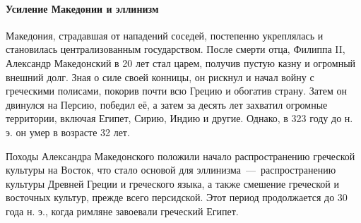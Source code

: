 \paragraph{Усиление Македонии и эллинизм}

Македония, страдавшая от нападений соседей, постепенно укреплялась и становилась централизованным государством. После смерти отца, Филиппа II, Александр Македонский в 20 лет стал царем, получив пустую казну и огромный внешний долг. Зная о силе своей конницы, он рискнул и начал войну с греческими полисами, покорив почти всю Грецию и обогатив страну. Затем он двинулся на Персию, победил её, а затем за десять лет захватил огромные территории, включая Египет, Сирию, Индию и другие. Однако, в 323 году до н. э. он умер в возрасте 32 лет.



Походы Александра Македонского положили начало распространению греческой культуры на Восток, что стало основой для эллинизма~---~распространению культуры Древней Греции и греческого языка, а также смешение греческой и восточных культур, прежде всего персидской. Этот период продолжается до 30 года н. э., когда римляне завоевали греческий Египет.

